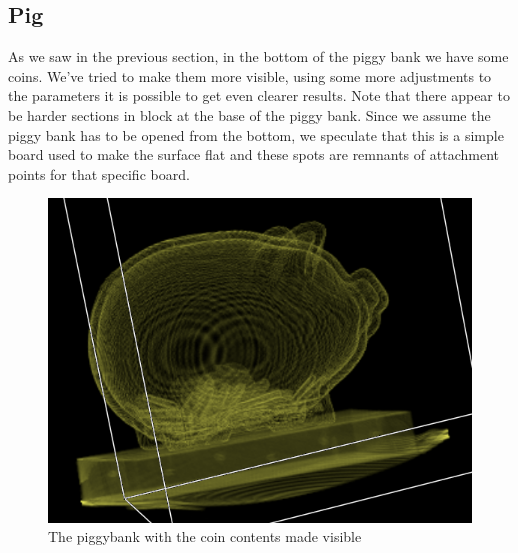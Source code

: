\documentclass[a4paper,twoside,11pt]{article}
\begin{document}
 \subsection{Pig}
 As we saw in the previous section, in the bottom of the piggy bank we have some coins. We've tried to make them more visible, using some more adjustments to the parameters it is possible to get even clearer results. Note that there appear to be harder sections in block at the base of the piggy bank. Since we assume the piggy bank has to be opened from the bottom, we speculate that this is a simple board used to make the surface flat and these spots are remnants of attachment points for that specific board.
 \begin{figure}[H]
 \centering
 \includegraphics[scale=0.5]{images/pigOp}
 \caption{The piggybank with the coin contents made visible}
 \label{pigOp}
 \end{figure}
 
\end{document}
